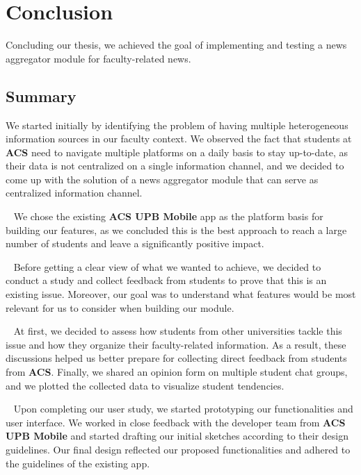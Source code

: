 \chapter{Conclusion} \label{chapter7}

Concluding our thesis, we achieved the goal of implementing and testing a news aggregator module for faculty-related news.

\section{Summary} \label{7:summary}

We started initially by identifying the problem of having multiple heterogeneous information sources in our faculty context. We observed the fact that students at \textbf{ACS} need to navigate multiple platforms on a daily basis to stay up-to-date, as their data is not centralized on a single information channel, and we decided to come up with the solution of a news aggregator module that can serve as centralized information channel. 

~
We chose the existing \textbf{ACS UPB Mobile} app as the platform basis for building our features, as we concluded this is the best approach to reach a large number of students and leave a significantly positive impact.

~
Before getting a clear view of what we wanted to achieve, we decided to conduct a study and collect feedback from students to prove that this is an existing issue. Moreover, our goal was to understand what features would be most relevant for us to consider when building our module. 

~
At first, we decided to assess how students from other universities tackle this issue and how they organize their faculty-related information. As a result, these discussions helped us better prepare for collecting direct feedback from students from \textbf{ACS}. Finally, we shared an opinion form on multiple student chat groups, and we plotted the collected data to visualize student tendencies.

~
Upon completing our user study, we started prototyping our functionalities and user interface.  We worked in close feedback with the developer team from \textbf{ACS UPB Mobile} and started drafting our initial sketches according to their design guidelines. Our final design reflected our proposed functionalities and adhered to the guidelines of the existing app.

